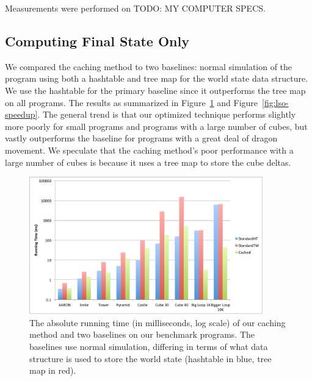 \documentclass{sig-alternate}
\newcommand{\todo}[1]{{\color{red} TODO: #1}}
\begin{document}
Measurements were performed on \todo{MY COMPUTER SPECS}.

\subsection{Computing Final State Only}
We compared the caching method to two baselines: normal simulation of the program using both a hashtable and tree map for the world state data structure. We use the hashtable for the primary baseline since it outperforms the tree map on all programs. The results as summarized in Figure~\ref{fig:lso-absolute} and Figure~\ref{fig:lso-speedup}. The general trend is that our optimized technique performs slightly more poorly for small programs and programs with a large number of cubes, but vastly outperforms the baseline for programs with a great deal of dragon movement. We speculate that the caching method's poor performance with a large number of cubes is because it uses a tree map to store the cube deltas. 

\begin{figure}[ht!]
  \centering
  \includegraphics[width=0.9\textwidth]{images/lso-absolute}
  \caption{The absolute running time (in milliseconds, log scale) of our caching method and two baselines on our benchmark programs. The baselines use normal simulation, differing in terms of what data structure is used to store the world state (hashtable in blue, tree map in red). }
  \label{fig:lso-absolute}
\end{figure}
\end{document}
